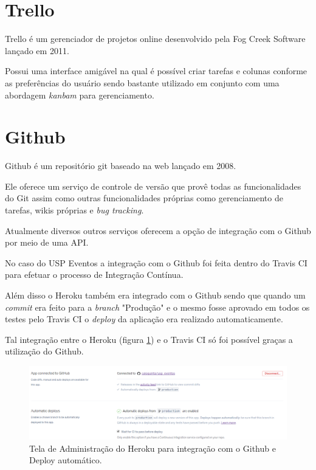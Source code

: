 \section{Trello}
\par Trello é um gerenciador de projetos online desenvolvido pela Fog Creek Software lançado em 2011.
\par Possui uma interface amigável na qual é possível criar tarefas e colunas conforme as preferências do usuário sendo bastante utilizado em conjunto com uma abordagem \emph{kanbam} para gerenciamento.

\section{Github}
\par Github é um repositório git baseado na web lançado em 2008.
\par Ele oferece um serviço de controle de versão que provê todas as funcionalidades do Git assim como outras funcionalidades próprias como gerenciamento de tarefas, wikis próprias e \emph{bug tracking}.
\par Atualmente diversos outros serviços oferecem a opção de integração com o Github por meio de uma API.
\par No caso do USP Eventos a integração com o Github foi feita dentro do Travis CI para efetuar o processo de Integração Contínua.
\par Além disso o Heroku também era integrado com o Github sendo que quando um \emph{commit} era feito para a \emph{branch} "Produção" e o mesmo fosse aprovado em todos os testes pelo Travis CI o \emph{deploy} da aplicação era realizado automaticamente.
\par Tal integração entre o Heroku (figura \ref{fig:heroku_automatic_deploy}) e o Travis CI só foi possível graças a utilização do Github.
\begin{figure}[htb]
\centering
\includegraphics[width=15cm]{figuras/heroku_automatic_deploy}
\caption{\label{fig:heroku_automatic_deploy} Tela de Administração do Heroku para integração com o Github e Deploy automático.}
\end{figure}
